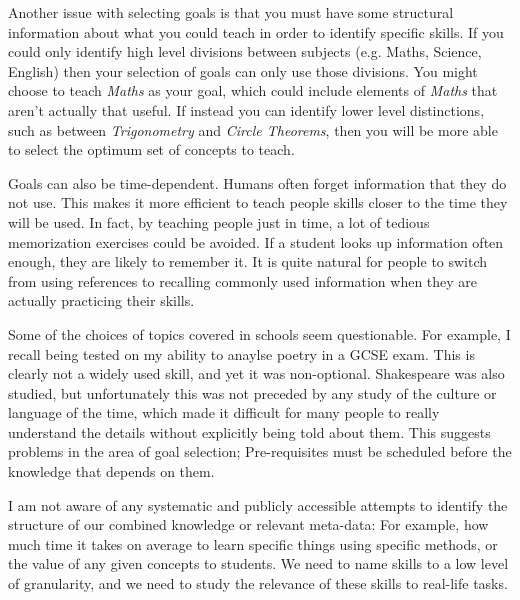       Another issue with selecting goals is that you must have some structural information about what you could teach in order to identify specific skills. If you could only identify high level divisions between subjects (e.g. Maths, Science, English) then your selection of goals can only use those divisions. You might choose to teach \emph{Maths} as your goal, which could include elements of \emph{Maths} that aren't actually that useful. If instead you can identify lower level distinctions, such as between \emph{Trigonometry} and \emph{Circle Theorems}, then you will be more able to select the optimum set of concepts to teach.

      Goals can also be time-dependent. Humans often forget information that they do not use. This makes it more efficient to teach people skills closer to the time they will be used. In fact, by teaching people just in time, a lot of tedious memorization exercises could be avoided. If a student looks up information often enough, they are likely to remember it. It is quite natural for people to switch from using references to recalling commonly used information when they are actually practicing their skills.

      Some of the choices of topics covered in schools seem questionable. For example, I recall being tested on my ability to anaylse poetry in a GCSE exam. This is clearly not a widely used skill, and yet it was non-optional. Shakespeare was also studied, but unfortunately this was not preceded by any study of the culture or language of the time, which made it difficult for many people to really understand the details without explicitly being told about them. This suggests problems in the area of goal selection; Pre-requisites must be scheduled before the knowledge that depends on them.

      I am not aware of any systematic and publicly accessible attempts to identify the structure of our combined knowledge or relevant meta-data: For example, how much time it takes on average to learn specific things using specific methods, or the value of any given concepts to students. We need to name skills to a low level of granularity, and we need to study the relevance of these skills to real-life tasks.



